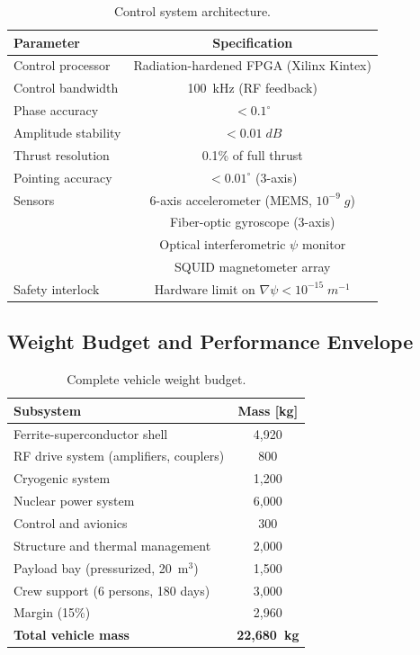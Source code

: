 \documentclass[twocolumn,prl,superscriptaddress,nofootinbib,longbibliography,floatfix]{revtex4-2}
\begin{document}
\begin{table}[h]
\centering
\caption{Control system architecture.}
\label{tab:control}
\begin{ruledtabular}
\begin{tabular}{lc}
Parameter & Specification \\
\hline
Control processor & Radiation-hardened FPGA (Xilinx Kintex) \\
Control bandwidth & 100~kHz (RF feedback) \\
Phase accuracy & $< 0.1^\circ$ \\
Amplitude stability & $< 0.01\;\si{dB}$ \\
Thrust resolution & 0.1\% of full thrust \\
Pointing accuracy & $< 0.01^\circ$ (3-axis) \\
Sensors & 6-axis accelerometer (MEMS, $10^{-9}\;g$) \\
 & Fiber-optic gyroscope (3-axis) \\
 & Optical interferometric $\psi$ monitor \\
 & SQUID magnetometer array \\
Safety interlock & Hardware limit on $\nabla\psi < 10^{-15}\;\si{m^{-1}}$ \\
\end{tabular}
\end{ruledtabular}
\end{table}

\subsection{Weight Budget and Performance Envelope}

\begin{table}[h]
\centering
\caption{Complete vehicle weight budget.}
\label{tab:weight}
\begin{ruledtabular}
\begin{tabular}{lc}
Subsystem & Mass [kg] \\
\hline
Ferrite-superconductor shell & 4{,}920 \\
RF drive system (amplifiers, couplers) & 800 \\
Cryogenic system & 1{,}200 \\
Nuclear power system & 6{,}000 \\
Control and avionics & 300 \\
Structure and thermal management & 2{,}000 \\
Payload bay (pressurized, 20~m$^3$) & 1{,}500 \\
Crew support (6 persons, 180 days) & 3{,}000 \\
Margin (15\%) & 2{,}960 \\
\hline
\textbf{Total vehicle mass} & \textbf{22{,}680~kg} \\
\end{tabular}
\end{ruledtabular}
\end{table}
\end{document}
